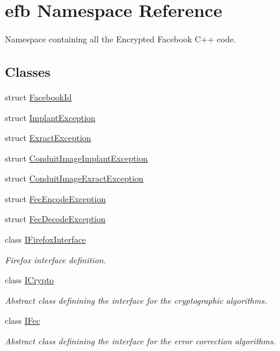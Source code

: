 \hypertarget{namespaceefb}{
\section{efb Namespace Reference}
\label{namespaceefb}
}


Namespace containing all the Encrypted Facebook C++ code.  


\subsection*{Classes}
\begin{DoxyCompactItemize}
\item 
struct \hyperlink{structefb_1_1FacebookId}{FacebookId}
\item 
struct \hyperlink{structefb_1_1ImplantException}{ImplantException}
\item 
struct \hyperlink{structefb_1_1ExractException}{ExractException}
\item 
struct \hyperlink{structefb_1_1ConduitImageImplantException}{ConduitImageImplantException}
\item 
struct \hyperlink{structefb_1_1ConduitImageExractException}{ConduitImageExractException}
\item 
struct \hyperlink{structefb_1_1FecEncodeException}{FecEncodeException}
\item 
struct \hyperlink{structefb_1_1FecDecodeException}{FecDecodeException}
\item 
class \hyperlink{classefb_1_1IFirefoxInterface}{IFirefoxInterface}
\begin{DoxyCompactList}\small\item\em Firefox interface definition. \item\end{DoxyCompactList}\item 
class \hyperlink{classefb_1_1ICrypto}{ICrypto}
\begin{DoxyCompactList}\small\item\em Abstract class definining the interface for the cryptographic algorithms. \item\end{DoxyCompactList}\item 
class \hyperlink{classefb_1_1IFec}{IFec}
\begin{DoxyCompactList}\small\item\em Abstract class definining the interface for the error correction algorithms. \item\end{DoxyCompactList}\item 

\end{DoxyCompactItemize}
